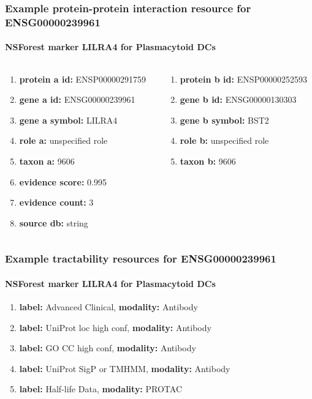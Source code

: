 \documentclass[aspectratio=169,xcolor=dvipsnames]{beamer}
\begin{document}
\begin{frame}
  \frametitle{Example \textbf{protein-protein interaction} resource for ENSG00000239961}
  \framesubtitle{NSForest marker LILRA4 for Plasmacytoid DCs}
  \begin{columns}[t]\footnotesize
    \begin{column}{0.5\textwidth}
      \begin{enumerate}
      \item[]\textbf{protein a id:} ENSP00000291759
      \item[]\textbf{gene a id:} ENSG00000239961
      \item[]\textbf{gene a symbol:} LILRA4
      \item[]\textbf{role a:} unspecified role
      \item[]\textbf{taxon a:} 9606
      \item[]\textbf{evidence score:} 0.995
      \item[]\textbf{evidence count:} 3
      \item[]\textbf{source db:} string
      \end{enumerate}
    \end{column}
    \begin{column}{0.5\textwidth}
      \begin{enumerate}
      \item[]\textbf{protein b id:} ENSP00000252593
      \item[]\textbf{gene b id:} ENSG00000130303
      \item[]\textbf{gene b symbol:} BST2
      \item[]\textbf{role b:} unspecified role
      \item[]\textbf{taxon b:} 9606
      \end{enumerate}
    \end{column}
  \end{columns}
\end{frame}

\begin{frame}
  \frametitle{Example \textbf{tractability} resources for ENSG00000239961}
  \framesubtitle{NSForest marker LILRA4 for Plasmacytoid DCs}
  \begin{enumerate}\footnotesize
  \item[]\textbf{label:} Advanced Clinical, \textbf{modality:} Antibody
  \item[]\textbf{label:} UniProt loc high conf, \textbf{modality:} Antibody
  \item[]\textbf{label:} GO CC high conf, \textbf{modality:} Antibody
  \item[]\textbf{label:} UniProt SigP or TMHMM, \textbf{modality:} Antibody
  \item[]\textbf{label:} Half-life Data, \textbf{modality:} PROTAC
  \end{enumerate}
\end{frame}
\end{document}
